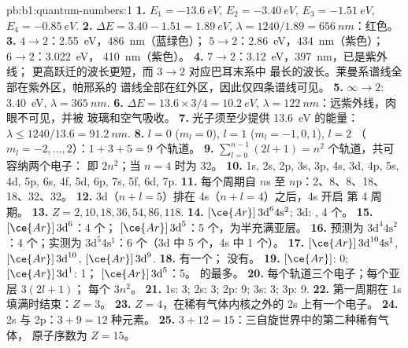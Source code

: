 \begin{solution}{pb:b1:quantum-numbers:1}
\textbf{1.} $E_1 = \qty{-13.6}{eV}$, $E_2 = \qty{-3.40}{eV}$,
$E_3 = \qty{-1.51}{eV}$, $E_4 = \qty{-0.85}{eV}$.
\textbf{2.} $\Delta E = 3.40 - 1.51 = \qty{1.89}{eV}$, $\lambda = 1240/1.89
= \qty{656}{nm}$：红色。
\textbf{3.} $4 \to 2$：\qty{2.55}{eV}，\qty{486}{nm}（蓝绿色）；
$5 \to 2$：\qty{2.86}{eV}，\qty{434}{nm}（紫色）；$6 \to 2$：\qty{3.022}{eV}，
\qty{410}{nm}（紫色）。
\textbf{4.} $7 \to 2$：\qty{3.12}{eV}，\qty{397}{nm}，已是紫外线；
更高跃迁的波长更短，而 $3 \to 2$ 对应巴耳末系中
最长的波长。莱曼系谱线全部在紫外区，帕邢系的
谱线全部在红外区，因此仅四条谱线可见。
\textbf{5.} $\infty \to 2$: \qty{3.40}{eV}, $\lambda = \qty{365}{nm}$.
\textbf{6.} $\Delta E = 13.6 \times 3/4 = \qty{10.2}{eV}$, $\lambda =
\qty{122}{nm}$：远紫外线，肉眼不可见，并被
玻璃和空气吸收。
\textbf{7.} 光子须至少提供 \qty{13.6}{eV} 的能量：$\lambda \le
1240/13.6 = \qty{91.2}{nm}$.
\textbf{8.} $l = 0$ ($m_l = 0$), $l = 1$ ($m_l = -1, 0, 1$), $l = 2$
（$m_l = -2, \dots, 2$）：$1 + 3 + 5 = 9$ 个轨道。
\textbf{9.} $\sum_{l=0}^{n-1}(2l+1) = n^2$ 个轨道，共可容纳两个电子：
即 $2n^2$；当 $n = 4$ 时为 32。
\textbf{10.} 1s, 2s, 2p, 3s, 3p, 4s, 3d, 4p, 5s, 4d, 5p, 6s, 4f, 5d, 6p,
7s, 5f, 6d, 7p.
\textbf{11.} 每个周期自 $n$s 至 $n$p：2、8、8、18、18、32、32。
\textbf{12.} 3d（$n + l = 5$）排在 4s（$n + l = 4$）之后，4s 开启
第 4 周期。
\textbf{13.} $Z = 2, 10, 18, 36, 54, 86, 118$.
\textbf{14.} $[\ce{Ar}]\,3\text{d}^6 4\text{s}^2$; 3d: ,
4 个。
\textbf{15.}  $[\ce{Ar}]\,3\text{d}^6$：4 个；
 $[\ce{Ar}]\,3\text{d}^5$：5 个，为半充满亚层。
\textbf{16.} 预测为 $3\text{d}^4 4\text{s}^2$：4 个；实测为
$3\text{d}^5 4\text{s}^1$：6 个（3d 中 5 个，4s 中 1 个）。
\textbf{17.}  $[\ce{Ar}]\,3\text{d}^{10} 4\text{s}^1$, 
$[\ce{Ar}]\,3\text{d}^{10}$,  $[\ce{Ar}]\,3\text{d}^9$.
\textbf{18.}  有一个； 没有。
\textbf{19.}  $[\ce{Ar}]$: 0;  $[\ce{Ar}]\,3\text{d}^1$:
1； $[\ce{Ar}]\,3\text{d}^5$：5。 的最多。
\textbf{20.} 每个轨道三个电子；每个亚层 $3(2l + 1)$；
每个 $3n^2$。
\textbf{21.} 1s: 3; 2s: 3; 2p: 9; 3s: 3; 3p: 9.
\textbf{22.} 第一周期在 1s 填满时结束：$Z = 3$。
\textbf{23.} $Z = 4$，在稀有气体内核之外的 2s 上有一个电子。
\textbf{24.} 2s 与 2p：$3 + 9 = 12$ 种元素。
\textbf{25.} $3 + 12 = 15$：三自旋世界中的第二种稀有气体，
原子序数为 \textbf{$Z = 15$}。
\end{solution}
